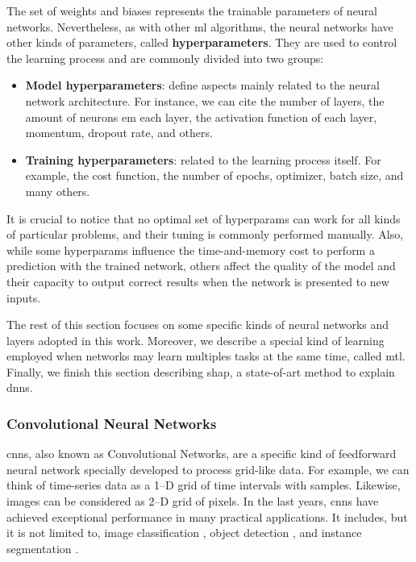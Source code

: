 The set of weights and biases represents the trainable parameters of neural networks. Nevertheless, as with other \acs{ml} algorithms, the neural networks have other kinds of parameters, called \textbf{hyperparameters}. They are used to control the learning process and are commonly divided into two groups:

\begin{itemize}
\item \textbf{Model hyperparameters}: define aspects mainly related to the neural network architecture. For instance, we can cite the number of layers, the amount of neurons em each layer, the activation function of each layer, momentum, dropout rate, and others.

\item \textbf{Training hyperparameters}: related to the learning process itself. For example, the cost function, the number of epochs, optimizer, batch size, and many others.
\end{itemize}

It is crucial to notice that no optimal set of hyperparams can work for all kinds of particular problems, and their tuning is commonly performed manually. Also, while some hyperparams influence the time-and-memory cost to perform a prediction with the trained network, others affect the quality of the model and their capacity to output correct results when the network is presented to new inputs.

The rest of this section focuses on some specific kinds of neural networks and layers adopted in this work. Moreover, we describe a special kind of learning employed when networks may learn multiples tasks at the same time, called \acl{mtl}. Finally, we finish this section describing \acs{shap}, a state-of-art method to explain \aclp{dnn}.

\subsubsection{Convolutional Neural Networks}

\acfp{cnn}, also known as Convolutional Networks, are a specific kind of feedforward neural network specially developed to process grid-like data. For example, we can think of time-series data as a 1--D grid of time intervals with samples. Likewise, images can be considered as 2--D grid of pixels. In the last years, \acsp{cnn} have achieved exceptional performance in many practical applications. It includes, but it is not limited to, image classification \citep{li2014medical, guo2017simple, paoletti2018new}, object detection \citep{cai2016unified, wu2017squeezedet}, and instance segmentation \citep{wang2020solov2, xu2020convolutional, zhang2020mask}.

